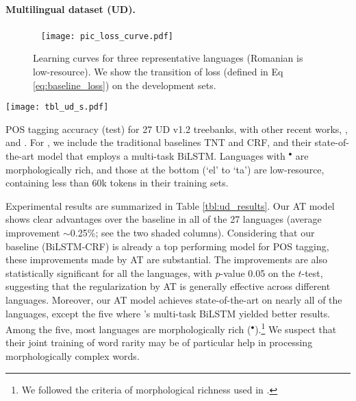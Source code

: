 \documentclass[11pt,a4paper]{article}
\begin{document}
\paragraph{Multilingual dataset (UD).}

\begin{figure*}[!h]
    ~\vspace{-1.4mm}\centering
    \texttt{[image: pic\_loss\_curve.pdf]}
    \caption{Learning curves for three representative languages (Romanian is low-resource). We show the transition of loss (defined in Eq \protect\ref{eq:baseline_loss}) on the development sets.
    }
    \label{fig:learning_curve}
\vspace{-4mm}
\end{figure*}

\begin{table}[!t]
    \hspace{-2mm}\vspace{-1mm}
    \texttt{[image: tbl\_ud\_s.pdf]}
    \caption{
    POS tagging accuracy (test) for 27 UD v1.2 treebanks, with other recent works,  \protect{}, \protect{} and \protect{}.
    For \protect{}, we include the traditional baselines TNT and CRF, and their state-of-the-art model that employs a multi-task BiLSTM.
    Languages with $^\bullet$ are morphologically rich, and 
    those at the bottom (`el' to `ta') are low-resource, containing less than 60k tokens in their training sets.
    }
\label{tbl:ud_results}
\vspace{-4mm}
\end{table}




Experimental results are summarized in Table \ref{tbl:ud_results}.
Our AT model shows clear advantages over the baseline in all of the 27 languages (average improvement $\sim$0.25\%; see the two shaded columns). 
Considering that our baseline (BiLSTM-CRF) is already a top performing model for POS tagging,
these improvements made by AT are substantial.
The improvements are also statistically significant for all the languages, with $p$-value \scalebox{0.9}{$<$} 0.05 on the $t$-test,
suggesting that the regularization by AT is generally effective across different languages.
Moreover, our AT model achieves state-of-the-art on nearly all of the languages, except the five where 
's multi-task BiLSTM yielded better results.
Among the five, most languages are morphologically rich ($^\bullet$).\footnote{We followed the criteria of morphological richness used in .} 
We suspect that their joint training of word rarity may be of particular help in processing morphologically complex words.
\end{document}
